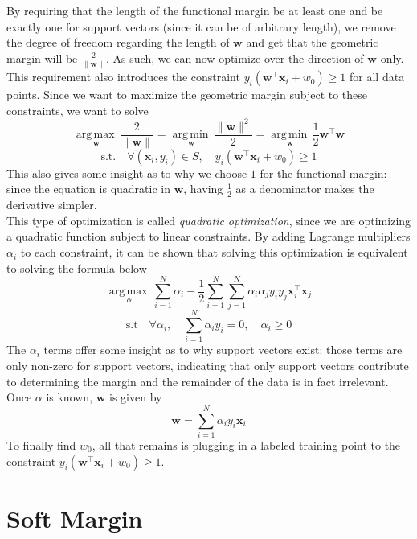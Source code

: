 \documentclass[12pt]{article}
\newcommand{\norm}[1]{\lVert#1\rVert}
\newcommand{\argmax}[1]{\underset{#1}{\operatorname{arg\,max\,}}}
\newcommand{\argmin}[1]{\underset{#1}{\operatorname{arg\,min\,}}}
\begin{document}
By requiring that the length of the functional margin be at least one and be exactly one for support vectors (since it can be of arbitrary length), we remove the degree of freedom regarding the length of $\mathbf{w}$ and get that the geometric margin will be $\frac{2}{\norm{\mathbf{w}}}$. As such, we can now optimize over the direction of $\mathbf{w}$ only. This requirement also introduces the constraint $y_i(\mathbf{w}^\top\mathbf{x}_i + w_0) \geq 1$ for all data points. Since we want to maximize the geometric margin subject to these constraints, we want to solve
\[ \argmax{\mathbf{w}}\frac{2}{\norm{\mathbf{w}}} = \argmin{\mathbf{w}}\frac{\norm{\mathbf{w}}^2}{2} = \argmin{\mathbf{w}}\frac{1}{2}\mathbf{w}^\top\mathbf{w}  \]
\[ \text{s.t.} \quad \forall (\mathbf{x}_i, y_i) \in S, \quad y_i(\mathbf{w}^\top\mathbf{x}_i + w_0) \geq 1 \]
This also gives some insight as to why we choose $1$ for the functional margin: since the equation is quadratic in $\mathbf{w}$, having $\frac{1}{2}$ as a denominator makes the derivative simpler.
\\\newline
This type of optimization is called \textit{quadratic optimization}, since we are optimizing a quadratic function subject to linear constraints. By adding Lagrange multipliers $\alpha_i$ to each constraint, it can be shown that solving this optimization is equivalent to solving the formula below
\[ \argmax{\alpha}\sum_{i=1}^N\alpha_i - \frac{1}{2}\sum_{i=1}^{N}\sum_{j=1}^{N}\alpha_i\alpha_jy_iy_j\mathbf{x}_i^\top\mathbf{x}_j \]
\[ \text{s.t} \quad \forall \alpha_i, \quad \sum_{i=1}^{N}\alpha_iy_i=0, \quad \alpha_i \geq 0 \]
The $\alpha_i$ terms offer some insight as to why support vectors exist: those terms are only non-zero for support vectors, indicating that only support vectors contribute to determining the margin and the remainder of the data is in fact irrelevant.
\\\newline
Once $\alpha$ is known, $\mathbf{w}$ is given by
\[ \mathbf{w} = \sum_{i=1}^{N}\alpha_iy_i\mathbf{x}_i \]
To finally find $w_0$, all that remains is plugging in a labeled training point to the constraint $y_i(\mathbf{w}^\top\mathbf{x}_i + w_0) \geq 1$.

\section{Soft Margin}
\end{document}
